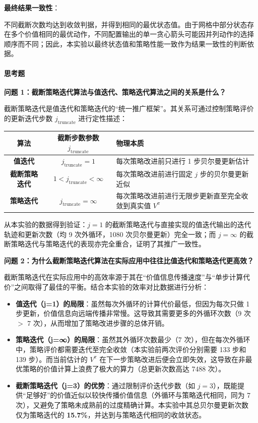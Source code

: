 \documentclass[11pt,a4paper,UTF8]{ctexart}
\numberwithin{figure}{section}
\numberwithin{table}{section}
\newcommand{\answerlabel}{%
  \par\smallskip\noindent{\heiti\bfseries 回答：}\quad}
\begin{document}
\textbf{最终结果一致性}：

不同截断次数均达到收敛判据，并得到相同的最优状态值。由于网格中部分状态存在多个价值相同的最优动作，不同配置输出的单一贪心箭头可能因并列动作的选择顺序而不同；因此，本实验以最终状态值和策略性能一致作为结果一致性的判断依据。

\paragraph{思考题}


\textbf{问题 1：截断策略迭代算法与值迭代、策略迭代算法之间的关系是什么？}


\answerlabel 

截断策略迭代是值迭代和策略迭代的``统一推广框架''。其关系可通过控制策略评价的更新迭代步数 $j_\text{truncate}$ 进行定性描述：

\begin{table}[H]
\centering
\begin{tabularx}{\textwidth}{c c Y}
\toprule
算法 & 截断步数参数 $j_\text{truncate}$ & 物理本质 \\
\midrule
\textbf{值迭代} & $j_\text{truncate} = 1$ & 每次策略改进前只进行 1 步贝尔曼更新估计 \\
\textbf{截断策略迭代} & $1 < j_\text{truncate} < \infty$ & 每次策略改进前进行固定 $j$ 步的贝尔曼更新近似 \\
\textbf{策略迭代} & $j_\text{truncate} = \infty$ & 每次策略改进前进行无限步更新直至完全收敛到真实值 $V^\pi$ \\
\bottomrule
\end{tabularx}
\end{table}

从本实验的数据得到验证：$j=1$ 的截断策略迭代与直接实现的值迭代输出的迭代轨迹和更新次数（均 9 次外循环，1080 次贝尔曼更新）完全一致；而 $j=\infty$ 的截断策略迭代与策略迭代的表现亦完全重合，证明了其推广一致性。


\textbf{问题 2：为什么截断策略迭代算法在实际应用中往往比值迭代和策略迭代更高效？}


\answerlabel 

截断策略迭代在实际应用中的高效率源于其在``价值信息传播速度''与``单步计算代价''之间取得了最佳的平衡。结合本实验的效率对比数据进行分析：

\begin{itemize}
    \item \textbf{值迭代（j=1）的局限}：虽然每次外循环的计算代价最低，但因为每次只做 1 步更新，价值信息向远端传播非常慢。这导致其需要更多的外循环次数（9 次 $>$ 7 次），从而增加了策略改进步骤的总体开销。
    \item \textbf{策略迭代（j=∞）的局限}：虽然其外循环次数最少（7 次），但在每次外循环中，策略评价都需要迭代至完全收敛（本实验前两次评价分别需要 133 步和 139 步）。而当前估计的 $V^{\pi}$ 在下一步策略改进后便会立即失效，这导致在非最优策略的价值计算上浪费了极大的算力（总更新次数高达 7488 次）。
    \item \textbf{截断策略迭代（j=3）的优势}：通过限制评价迭代步数（如 $j=3$），既能提供``足够好''的价值近似以较快传播价值信息（外循环与策略迭代相同，同为 7 次），又避免了策略未成熟前的过度精确计算。本实验中其总贝尔曼更新次数仅为策略迭代的 \textbf{15.7\%}，并达到与策略迭代相同的收敛状态。
\end{itemize}
\end{document}
